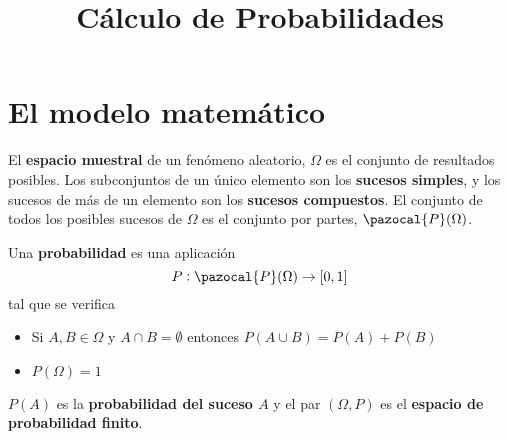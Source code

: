 \documentclass[a4paper, 11pt]{extarticle}
\date{}
\title{\Huge\vspace{-1em}Cálculo de Probabilidades}
\let\mathcal\pazocal
\begin{document}
\maketitle
\vspace{-8em}

\section*{El modelo matemático}
\label{sec:orgf60e590}
\vspace{-1.5em}
\begin{multicols*}{2}
\vspace{-1.5em}
El \textbf{espacio muestral} de un fenómeno aleatorio, \(\Omega\) es el conjunto
de resultados posibles. Los subconjuntos de un único elemento son los 
\textbf{sucesos simples}, y los sucesos de más de un elemento son los \textbf{sucesos compuestos}.
El conjunto de todos los posibles sucesos de \(\Omega\) es el conjunto
por partes, \(\mathcal{P}(\Omega)\).

Una \textbf{probabilidad} es una aplicación 
\[ P: \mathcal{P}(\Omega) \rightarrow [0,1] \]
tal que se verifica

\begin{itemize}
\item Si \(A,B \in \Omega\) y \(A \cap B = \emptyset\) entonces \(P(A \cup B) = P(A) + P(B)\)
\item \(P(\Omega) = 1\)
\end{itemize}
\(P(A)\) es la \textbf{probabilidad del suceso \(A\)} y el par \((\Omega, P)\) es
el \textbf{espacio de probabilidad finito}. 


\end{multicols*}
\end{document}
